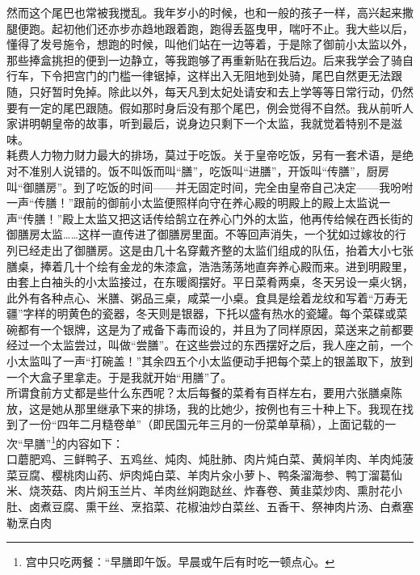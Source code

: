然而这个尾巴也常被我搅乱。我年岁小的时候，也和一般的孩子一样，高兴起来撒腿便跑。起初他们还亦步亦趋地跟着跑，跑得丢盔曳甲，喘吁不止。我大些以后，懂得了发号施令，想跑的时候，叫他们站在一边等着，于是除了御前小太监以外，那些捧盒挑担的便到一边静立，等我跑够了再重新贴在我后边。后来我学会了骑自行车，下令把宫门的门槛一律锯掉，这样出入无阻地到处骑，尾巴自然更无法跟随，只好暂时免掉。除此以外，每天凡到太妃处请安和去上学等等日常行动，仍然要有一定的尾巴跟随。假如那时身后没有那个尾巴，例会觉得不自然。我从前听人家讲明朝皇帝的故事，听到最后，说身边只剩下一个太监，我就觉着特别不是滋味。\\

耗费人力物力财力最大的排场，莫过于吃饭。关于皇帝吃饭，另有一套术语，是绝对不准别人说错的。饭不叫饭而叫“膳”，吃饭叫“进膳”，开饭叫“传膳”，厨房叫“御膳房”。到了吃饭的时间——并无固定时间，完全由皇帝自己决定——我吩咐一声“传膳！”跟前的御前小太监便照样向守在养心殿的明殿上的殿上太监说一声“传膳！”殿上太监又把这话传给鹄立在养心门外的太监，他再传给候在西长街的御膳房太监……这样一直传进了御膳房里面。不等回声消失，一个犹如过嫁妆的行列已经走出了御膳房。这是由几十名穿戴齐整的太监们组成的队伍，抬着大小七张膳桌，捧着几十个绘有金龙的朱漆盒，浩浩荡荡地直奔养心殿而来。进到明殿里，由套上白袖头的小太监接过，在东暖阁摆好。平日菜肴两桌，冬天另设一桌火锅，此外有各种点心、米膳、粥品三桌，咸菜一小桌。食具是绘着龙纹和写着“万寿无疆”字样的明黄色的瓷器，冬天则是银器，下托以盛有热水的瓷罐。每个菜碟或菜碗都有一个银牌，这是为了戒备下毒而设的，并且为了同样原因，菜送来之前都要经过一个太监尝过，叫做“尝膳”。在这些尝过的东西摆好之后，我人座之前，一个小太监叫了一声“打碗盖！”其余四五个小太监便动手把每个菜上的银盖取下，放到一个大盒子里拿走。于是我就开始“用膳”了。\\

所谓食前方丈都是些什么东西呢？太后每餐的菜肴有百样左右，要用六张膳桌陈放，这是她从那里继承下来的排场，我的比她少，按例也有三十种上下。我现在找到了一份“四年二月糙卷单”（即民国元年三月的一份菜单草稿），上面记载的一次“早膳”\footnote{宫中只吃两餐：“早膳即午饭。早晨或午后有时吃一顿点心。}的内容如下：\\

口蘑肥鸡、三鲜鸭子、五鸡丝、炖肉、炖肚肺、肉片炖白菜、黄焖羊肉、羊肉炖菠菜豆腐、樱桃肉山药、炉肉炖白菜、羊肉片汆小萝卜、鸭条溜海参、鸭丁溜葛仙米、烧茨菇、肉片焖玉兰片、羊肉丝焖跑跶丝、炸春卷、黄韭菜炒肉、熏肘花小肚、卤煮豆腐、熏干丝、烹掐菜、花椒油炒白菜丝、五香干、祭神肉片汤、白煮塞勒烹白肉\\

